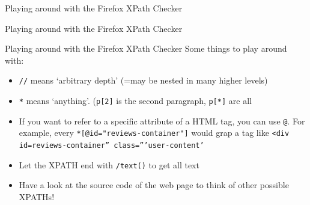 \documentclass{beamer}
\begin{document}
\begin{frame}{Playing around with the Firefox XPath Checker}
\end{frame}

\begin{frame}{Playing around with the Firefox XPath Checker}
\end{frame}






\begin{frame}{Playing around with the Firefox XPath Checker}
Some things to play around with:
\begin{itemize}
\item<1-> \texttt{//} means `arbitrary depth' (=may be nested in many higher levels)
\item<2->  \texttt{*} means `anything'. (\texttt{p[2]} is the second paragraph, \texttt{p[*]} are all
\item<3-> If you want to refer to a specific attribute of a HTML tag, you can use \texttt{@}. For example, every \texttt{*[@id="reviews-container"]} would grap a tag like \texttt{<div id=reviews-container'' class='''user-content'}
\item<4->  Let the XPATH end with \texttt{/text()} to get all text
\item<5->  Have a look at the source code of the web page to think of other possible XPATHs!
\end{itemize}
\end{frame}
\end{document}
